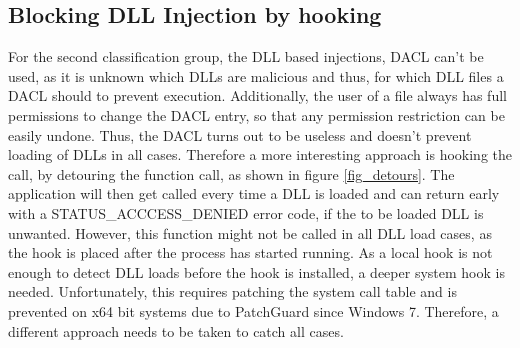 \subsection{Blocking DLL Injection by hooking }
For the second classification group, the DLL based injections, DACL can't be used, as it is unknown which DLLs are malicious and thus, for which DLL files a DACL should to prevent execution. Additionally, the user of a file always has full permissions to change the DACL entry, so that any permission restriction can be easily undone. Thus, the DACL turns out to be useless and doesn't prevent loading of DLLs in all cases. Therefore a more interesting approach is hooking the  call, by detouring the function call, as shown in figure \ref{fig_detours}. The application will then get called every time a DLL is loaded and can return early with a STATUS\_ACCCESS\_DENIED error code, if the to be loaded DLL is unwanted. However, this function might not be called in all DLL load cases, as the hook is placed after the process has started running. As a local hook is not enough to detect DLL loads before the hook is installed, a deeper system hook is needed. Unfortunately, this requires patching the system call table and is prevented on x64 bit systems due to PatchGuard since Windows 7. Therefore, a different approach needs to be taken to catch all cases.


